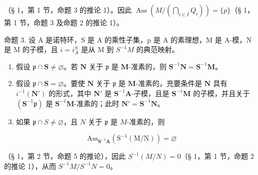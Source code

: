（§ 1，第 1 节，命题 3 的推论 1）。因此 \(\operatorname{Ass}\left(M / \left(\bigcap_{i \in I} Q_i\right)\right) = \{p\}\)（§ 1，第 1 节，命题 3 及命题 2 的推论 1）。

命题 3. 设 A 是诺特环，S 是 A 的乘性子集，p 是 A 的素理想，M 是 A-模，N 是 M 的子模，且 \(i = i_{A}^{S}\) 是从 M 到 \(S^{-1}M\) 的典范映射。

\begin{enumerate}
\def\labelenumi{(\roman{enumi})}
\item
  假设 \(\mathfrak{p} \cap \mathbf{S} \neq \varnothing\)。若 \(\mathbf{N}\) 关于 \(\mathfrak{p}\) 是 \(\mathbf{M}\)-准素的，则 \(\mathbf{S}^{-1}\mathbf{N} = \mathbf{S}^{-1}\mathbf{M}\)。
\item
  假设 \(\mathfrak{p} \cap \mathbf{S} = \varnothing\)。要使 \(\mathbf{N}\) 关于 \(\mathfrak{p}\) 是 \(\mathbf{M}\)-准素的，充要条件是 \(\mathbf{N}\) 具有 \(i^{-1}(\mathbf{N}')\) 的形式，其中 \(\mathbf{N}'\) 是 \(\mathbf{S}^{-1}\mathbf{A}\)-子模，且是 \(\mathbf{S}^{-1}\mathbf{M}\) 的子模，并且关于 \((\mathbf{S}^{-1}\mathfrak{p})\) 是 \(\mathbf{S}^{-1}\mathbf{M}\)-准素的；此时 \(\mathbf{N}' = \mathbf{S}^{-1}\mathbf{N}\)。
\item
  如果 \(\mathfrak{p} \cap S \neq \varnothing\)，且 \(N\) 关于 \(\mathfrak{p}\) 是 \(M\)-准素的，则
\end{enumerate}

\[
\mathrm{Ass} _ {\mathbf {S} ^ {- 1} \mathbf {A}} (\mathrm{S} ^ {- 1} (\mathrm{M} / \mathrm{N})) = \varnothing
\]

（§ 1，第 2 节，命题 5 的推论），因此 \(S^{-1}(M/N) = 0\)（§ 1，第 1 节，命题 2 的推论 1），从而 \(S^{-1}M/S^{-1}N = 0\)。

